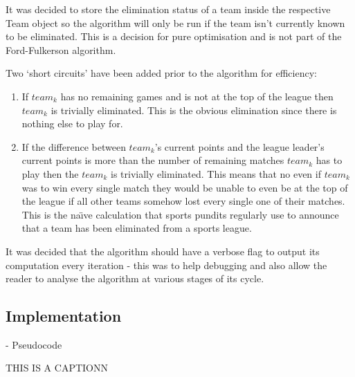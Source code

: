 It was decided to store the elimination status of a team inside the
respective Team object so the algorithm will only be run if the team isn't
currently known to be eliminated. This is a decision for pure optimisation and 
is not part of the Ford-Fulkerson algorithm.

Two `short circuits' have been added prior to the algorithm for efficiency:
\begin{enumerate}
\item If $team_k$ has no remaining games and is not at the top of the league
then $team_k$ is trivially eliminated. This is the obvious elimination since
there is nothing else to play for.
\item If the difference between $team_k$'s current points and the league 
leader's current points is more than the number of remaining matches $team_k$ 
has to play then the $team_k$ is trivially eliminated. This means that no even 
if $team_k$ was to win every single match they would be unable to even be at 
the top of the league if all other teams somehow lost every single one of their 
matches. This is the na\"{\i}ve calculation that sports pundits regularly use 
to announce that a team has been eliminated from a sports league.
\end{enumerate}

It was decided that the algorithm should have a verbose flag to output
its computation every iteration - this was to help debugging and also
allow the reader to analyse the algorithm at various stages of its
cycle. 

\subsection{Implementation}

- Pseudocode



\begin{algorithm}[H]
  \SetAlgoLined
    
    
   
   
  \caption{THIS IS A CAPTIONN}
\end{algorithm}